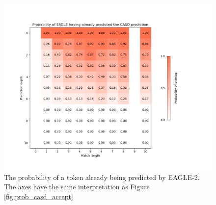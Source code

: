 \begin{figure}[h]
  \centering
  \includegraphics[width=\linewidth]{fig/prob_casd_eagle_overlap.png}
  \caption{The probability of a token already being predicted by EAGLE-2. The axes have the same interpretation as Figure \ref{fig:prob_casd_accept}}
  \label{fig:prob_casd_eagle_overlap}
\end{figure}